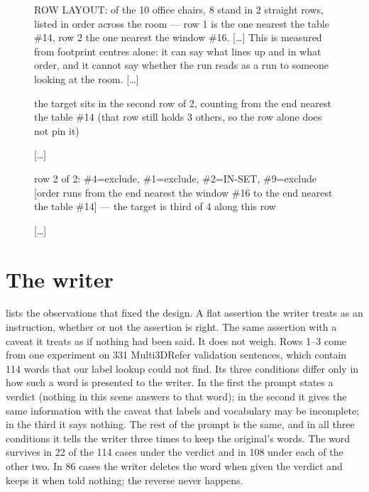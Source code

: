 \begin{figure}[t]
\begin{promptframe}
ROW LAYOUT: of the 10 office chairs, 8 stand in 2 straight rows, listed in order across the room --- row 1 is the one nearest the table \#14, row 2 the one nearest the window \#16. [\ldots] This is measured from footprint centres alone: it can say what lines up and in what order, and it cannot say whether the run reads as a run to someone looking at the room. [\ldots]

\hspace*{1em}the target sits in the second row of 2, counting from the end nearest the table \#14 (that row still holds 3 others, so the row alone does not pin it)

[\ldots]

\hspace*{1em}row 2 of 2: \#4=exclude, \#1=exclude, \#2=IN-SET, \#9=exclude [order runs from the end nearest the window \#16 to the end nearest the table \#14] --- the target is third of 4 along this row

[\ldots]
\end{promptframe}
\end{figure}

\section{The writer}
\label{supp:writer}
 lists the observations that fixed the design.
A flat assertion the writer treats as an instruction, whether or not the assertion is right.
The same assertion with a caveat it treats as if nothing had been said.
It does not weigh.
Rows 1--3 come from one experiment on 331 Multi3DRefer validation sentences, which contain 114 words that our label lookup could not find.
Its three conditions differ only in how such a word is presented to the writer.
In the first the prompt states a verdict (nothing in this scene answers to that word); in the second it gives the same information with the caveat that labels and vocabulary may be incomplete; in the third it says nothing.
The rest of the prompt is the same, and in all three conditions it tells the writer three times to keep the original's words.
The word survives in 22 of the 114 cases under the verdict and in 108 under each of the other two.
In 86 cases the writer deletes the word when given the verdict and keeps it when told nothing; the reverse never happens.


